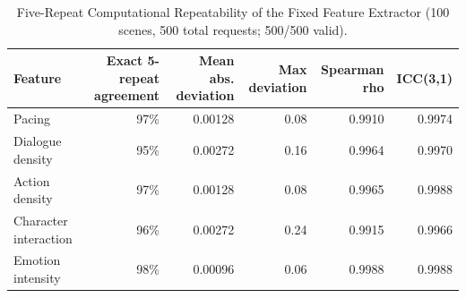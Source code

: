 \begin{table}[htbp]
\centering
\caption{Five-Repeat Computational Repeatability of the Fixed Feature Extractor (100 scenes, 500 total requests; 500/500 valid).}
\label{tab:table10_extractor_repeatability}
\begin{tabular}{lrrrrr}
\toprule
Feature & Exact 5-repeat agreement & Mean abs. deviation & Max deviation & Spearman rho & ICC(3,1) \\
\midrule
Pacing & 97\% & 0.00128 & 0.08 & 0.9910 & 0.9974 \\
Dialogue density & 95\% & 0.00272 & 0.16 & 0.9964 & 0.9970 \\
Action density & 97\% & 0.00128 & 0.08 & 0.9965 & 0.9988 \\
Character interaction & 96\% & 0.00272 & 0.24 & 0.9915 & 0.9966 \\
Emotion intensity & 98\% & 0.00096 & 0.06 & 0.9988 & 0.9988 \\
\bottomrule
\end{tabular}
\end{table}
